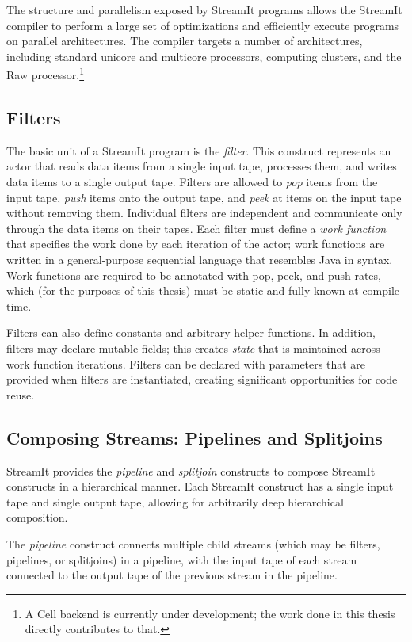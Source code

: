 The structure and parallelism exposed by StreamIt programs allows the StreamIt compiler to perform a large set of optimizations and efficiently execute programs on parallel architectures. The compiler targets a number of architectures, including standard unicore and multicore processors, computing clusters, and the Raw processor.\footnote{A Cell backend is currently under development; the work done in this thesis directly contributes to that.}

\subsection{Filters}

The basic unit of a StreamIt program is the \emph{filter}. This construct represents an actor that reads data items from a single input tape, processes them, and writes data items to a single output tape. Filters are allowed to \emph{pop} items from the input tape, \emph{push} items onto the output tape, and \emph{peek} at items on the input tape without removing them. Individual filters are independent and communicate only through the data items on their tapes. Each filter must define a \emph{work function} that specifies the work done by each iteration of the actor; work functions are written in a general-purpose sequential language that resembles Java in syntax. Work functions are required to be annotated with pop, peek, and push rates, which (for the purposes of this thesis) must be static and fully known at compile time.

Filters can also define constants and arbitrary helper functions. In addition, filters may declare mutable fields; this creates \emph{state} that is maintained across work function iterations. Filters can be declared with parameters that are provided when filters are instantiated, creating significant opportunities for code reuse.

\subsection{Composing Streams: Pipelines and Splitjoins}

StreamIt provides the \emph{pipeline} and \emph{splitjoin} constructs to compose StreamIt constructs in a hierarchical manner. Each StreamIt construct has a single input tape and single output tape, allowing for arbitrarily deep hierarchical composition.

The \emph{pipeline} construct connects multiple child streams (which may be filters, pipelines, or splitjoins) in a pipeline, with the input tape of each stream connected to the output tape of the previous stream in the pipeline.

